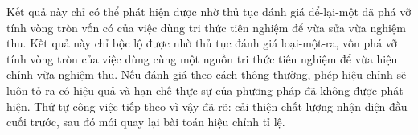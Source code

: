 Kết quả này chỉ có thể phát hiện được nhờ thủ tục đánh giá để-lại-một đã phá vỡ tính vòng tròn
vốn có của việc dùng tri thức tiên nghiệm để vừa sửa vừa nghiệm thu. Kết quả này chỉ bộc lộ được nhờ thủ tục đánh giá loại-một-ra, vốn phá vỡ tính vòng tròn của việc dùng cùng một nguồn tri thức tiên nghiệm để vừa hiệu chỉnh vừa nghiệm thu. Nếu đánh giá theo cách thông thường, phép hiệu chỉnh sẽ luôn tỏ ra có hiệu quả và hạn chế thực sự của phương pháp đã không được phát hiện. Thứ tự công việc tiếp theo vì vậy đã rõ: cải thiện chất lượng nhận diện đầu cuối trước, sau đó mới quay lại bài toán hiệu chỉnh tỉ lệ.
